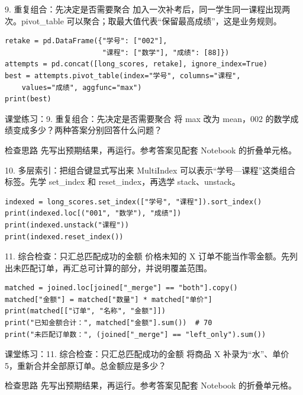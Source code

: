 \begin{frame}[fragile]{9. 重复组合：先决定是否需要聚合}
\small 加入一次补考后，同一学生同一课程出现两次。pivot\_table 可以聚合；取最大值代表“保留最高成绩”，这是业务规则。
\medskip
\begin{lstlisting}
retake = pd.DataFrame({"学号": ["002"],
                       "课程": ["数学"], "成绩": [88]})
attempts = pd.concat([long_scores, retake], ignore_index=True)
best = attempts.pivot_table(index="学号", columns="课程",
    values="成绩", aggfunc="max")
print(best)
\end{lstlisting}
\end{frame}
\begin{frame}[fragile]{课堂练习：9. 重复组合：先决定是否需要聚合}
将 max 改为 mean，002 的数学成绩变成多少？两种答案分别回答什么问题？
\medskip
\begin{block}{检查思路}
先写出预期结果，再运行。参考答案见配套 Notebook 的折叠单元格。
\end{block}
\end{frame}

\begin{frame}[fragile]{10. 多层索引：把组合键显式写出来}
\small MultiIndex 可以表示“学号—课程”这类组合标签。先学 set\_index 和 reset\_index，再选学 stack、unstack。
\medskip
\begin{lstlisting}
indexed = long_scores.set_index(["学号", "课程"]).sort_index()
print(indexed.loc[("001", "数学"), "成绩"])
print(indexed.unstack("课程"))
print(indexed.reset_index())
\end{lstlisting}
\end{frame}

\begin{frame}[fragile]{11. 综合检查：只汇总匹配成功的金额}
\small 价格未知的 X 订单不能当作零金额。先列出未匹配订单，再汇总可计算的部分，并说明覆盖范围。
\medskip
\begin{lstlisting}
matched = joined.loc[joined["_merge"] == "both"].copy()
matched["金额"] = matched["数量"] * matched["单价"]
print(matched[["订单", "名称", "金额"]])
print("已知金额合计：", matched["金额"].sum())  # 70
print("未匹配订单数：", (joined["_merge"] == "left_only").sum())
\end{lstlisting}
\end{frame}
\begin{frame}[fragile]{课堂练习：11. 综合检查：只汇总匹配成功的金额}
将商品 X 补录为“水”、单价 5，重新合并全部原订单。总金额应是多少？
\medskip
\begin{block}{检查思路}
先写出预期结果，再运行。参考答案见配套 Notebook 的折叠单元格。
\end{block}
\end{frame}
